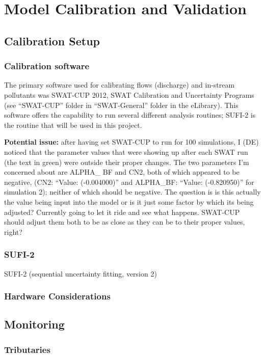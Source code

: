\documentclass[10pt,letterpaper]{article}%
\begin{document}
\section{Model Calibration and Validation}
	\subsection{Calibration Setup}
		\subsubsection{Calibration software}
		The primary software used for calibrating flows (discharge) and in-stream pollutants was SWAT-CUP 2012, SWAT Calibration and Uncertainty Programs (see ``SWAT-CUP'' folder in ``SWAT-General'' folder in the e\textunderscore Library). This software offers the capability to run several different analysis routines; SUFI-2 is the routine that will be used in this project. 
		
		\textbf{Potential issue:} after having set SWAT-CUP to run for 100 simulations, I (DE) noticed that the parameter values that were showing up after each SWAT run (the text in green) were outside their proper changes. The two parameters I'm concerned about are ALPHA\_ BF and CN2, both of which appeared to be negative, (CN2: ``Value: (-0.004000)'' and ALPHA\_BF: ``Value: (-0.820950)'' for simulation 2); neither of which should be negative. The question is is this actually the value being input into the model or is it just some factor by which its being adjusted? Currently going to let it ride and see what happens. SWAT-CUP should adjust them both to be as close as they can be to their proper values, right?
		
		\subsubsection{SUFI-2}
		SUFI-2 (sequential uncertainty fitting, version 2) 
		  
		\subsubsection{Hardware Considerations}
	\pagebreak
	\subsection{Monitoring}
		\subsubsection{Tributaries}
\end{document}
